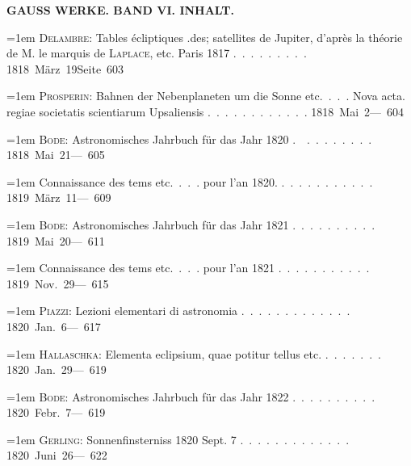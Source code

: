 \clearpage
{}
\noindent{}%
\parbox[b]{\dimexpr\textwidth-20mm\relax}{\centering\small\textbf{GAUSS WERKE. BAND VI. INHALT.}}%
\makebox[10mm][r]{}\par\nobreak\medskip
\begingroup
\raggedright
\noindent\hangindent=1em \textsc{Delambre}: Tables écliptiques .des; satellites de Jupiter, d'après la théorie de M. le marquis de \textsc{Laplace}, etc. Paris 1817 \mbox{.\ .\ .\ .\ .\ .\ .\ .\ .} \hfill\mbox{1818 März 19}\quad\mbox{Seite 603}\par\smallskip
\noindent\hangindent=1em \textsc{Prosperin}: Bahnen der Nebenplaneten um die Sonne etc.\ .\ .\ . Nova acta. regiae societatis scientiarum Upsaliensis \mbox{.\ .\ .\ .\ .\ .\ .\ .\ .\ .\ .\ .} \hfill\mbox{1818 Mai 2}\quad\mbox{--- 604}\par\smallskip
\noindent\hangindent=1em \textsc{Bode}: Astronomisches Jahrbuch für das Jahr 1820 \mbox{.\ \raisebox{.25ex}{-}\ .\ .\ .\ .\ .\ .\ .\ .} \hfill\mbox{1818 Mai 21}\quad\mbox{--- 605}\par\smallskip
\noindent\hangindent=1em Connaissance des tems etc.\ .\ .\ . pour l'an 1820. \mbox{.\ .\ .\ .\ .\ .\ .\ .\ .\ .\ .} \hfill\mbox{1819 März 11}\quad\mbox{--- 609}\par\smallskip
\noindent\hangindent=1em \textsc{Bode}: Astronomisches Jahrbuch für das Jahr 1821 \mbox{.\ .\ .\ .\ .\ .\ .\ .\ .\ .} \hfill\mbox{1819 Mai 20}\quad\mbox{--- 611}\par\smallskip
\noindent\hangindent=1em Connaissance des tems etc.\ .\ .\ . pour l'an 1821 \mbox{.\ .\ .\ .\ .\ .\ .\ .\ .\ .\ .} \hfill\mbox{1819 Nov. 29}\quad\mbox{--- 615}\par\smallskip
\noindent\hangindent=1em \textsc{Piazzi}: Lezioni elementari di astronomia \mbox{.\ .\ .\ .\ .\ .\ .\ .\ .\ .\ .\ .\ .} \hfill\mbox{1820 Jan. 6}\quad\mbox{--- 617}\par\smallskip
\noindent\hangindent=1em \textsc{Hallaschka}: Elementa eclipsium, quae potitur tellus etc. \mbox{.\ .\ .\ .\ .\ .\ .} \hfill\mbox{1820 Jan. 29}\quad\mbox{--- 619}\par\smallskip
\noindent\hangindent=1em \textsc{Bode}: Astronomisches Jahrbuch für das Jahr 1822 \mbox{.\ .\ .\ .\ .\ .\ .\ .\ .\ .} \hfill\mbox{1820 Febr. 7}\quad\mbox{--- 619}\par\smallskip
\noindent\hangindent=1em \textsc{Gerling}: Sonnenfinsterniss 1820 Sept. 7 \mbox{.\ .\ .\ .\ .\ .\ .\ .\ .\ .\ .\ .\ .} \hfill\mbox{1820 Juni 26}\quad\mbox{--- 622}\par\smallskip
